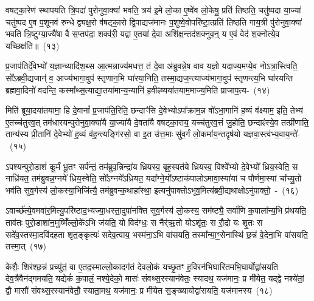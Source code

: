 वषट्का॒रेण॑ स्थापयति त्रि॒पदा॑ पुरोनुवा॒क्या॑ भवति॒ त्रय॑ इ॒मे लो॒का ए॒ष्वे॑व लो॒केषु॒ प्रति॑ तिष्ठति॒ चतु॑ष्पदा या॒ज्या॑ चतु॑ष्पद ए॒व प॒शूनव॑ रुन्धे द्व्यक्ष॒रो व॑षट्का॒रो द्वि॒पाद्यज॑मानः प॒शुष्वे॒वोपरि॑ष्टा॒त्प्रति॑ तिष्ठति गाय॒त्री पु॑रोनुवा॒क्या॑ भवति त्रि॒ष्टुग्या॒ज्यै॑षा वै स॒प्तप॑दा॒ शक्व॑री॒ यद्वा ए॒तया॑ दे॒वा अशि॑क्ष॒न्तद॑शक्नुव॒न्॒ य ए॒वं वेद॑ श॒क्नोत्ये॒व यच्छिक्ष॑ति॥~(१३)

{\anuvakamend[{दे॒वता॑नाङ्करोत्यु॒परि॑ष्टाल्ल॒क्ष्मा\-ऽऽ\-ज्य॑भागौ॒ प्रति॑ श॒क्नोत्ये॒व द्वे च॑}]}%

प्र॒जा\-प॑तिर्दे॒वेभ्यो॑ य॒ज्ञान्व्यादि॑श॒थ्स आ॒त्मन्नाज्य॑\-मधत्त॒ तं दे॒वा अ॑ब्रुवन्ने॒ष वाव य॒ज्ञो यदाज्य॒मप्ये॒व नो\-ऽत्रा॒स्त्विति॒ सो᳚\-ऽब्रवी॒द्यजान्॑ व॒ आज्य॑\-भागा॒वुप॑ स्तृणान॒भि घा॑रया॒निति॒ तस्मा॒द्\-यज॒न्त्याज्य॑\-भागा॒वुप॑ स्तृणन्त्य॒भि घा॑रयन्ति ब्रह्मवा॒दिनो॑ वदन्ति॒ कस्मा᳚थ्स॒त्याद्या॒तया॑\-मान्य॒न्यानि॑ ह॒वीꣴष्यया॑त\-याम॒माज्य॒\-मिति॑ प्राजाप॒त्य-~(१४)

मिति॑ ब्रूया॒दया॑तयामा॒ हि दे॒वानां᳚ प्र॒जा\-प॑ति॒रिति॒ छन्दाꣳ॑सि दे॒वेभ्यो\-ऽपा᳚क्राम॒न्न वो॑\-ऽभा॒गानि॑ ह॒व्यं व॑क्ष्याम॒ इति॒ तेभ्य॑ ए॒तच्च॑तुरव॒त् तम॑धारयन्पुरोनुवा॒क्या॑यै या॒ज्या॑यै दे॒वता॑यै वषट्का॒राय॒ यच्च॑तुरव॒त्तं जु॒होति॒ छन्दाꣴ॑स्ये॒व तत्प्री॑णाति॒ तान्य॑स्य प्री॒तानि॑ दे॒वेभ्यो॑ ह॒व्यं व॑ह॒न्त्यङ्गि॑रसो॒ वा इ॒त उ॑त्त॒माः सु॑व॒र्गं लो॒कमा॑य॒न्तदृष॑यो यज्ञवा॒स्त्व॑भ्य॒वाय॒न्ते॑-~(१५)

ऽपश्यन्पुरो॒डाशं॑ कू॒र्मं भू॒तꣳ सर्प॑न्तं॒ तम॑ब्रुव॒न्निन्द्रा॑य ध्रियस्व॒ बृह॒स्पत॑ये ध्रियस्व॒ विश्वे᳚भ्यो दे॒वेभ्यो᳚ ध्रिय॒स्वेति॒ स नाध्रि॑यत॒ तम॑ब्रुवन्न॒ग्नये᳚ ध्रिय॒स्वेति॒ सो᳚\-ऽग्नये᳚\-ऽध्रियत॒ यदा᳚ग्ने॒यो᳚\-ऽष्टाक॑पालो\-ऽमावा॒स्या॑यां च पौर्णमा॒स्यां चा᳚च्यु॒तो भव॑ति सुव॒र्गस्य॑ लो॒कस्या॒भिजि॑त्यै॒ तम॑ब्रुवन्क॒थाहा᳚स्था॒ इत्यनु॑पाक्तो\-ऽभूव॒मित्य॑ब्रवी॒द्यथाक्षो\-ऽनु॑पाक्तो॒~-~(१६)

ऽवार्च्छ॑त्ये॒वमवा॑र॒मित्यु॒परि॑ष्टाद॒भ्यज्या॒धस्ता॒दुपा॑नक्ति सुव॒र्गस्य॑ लो॒कस्य॒ सम॑ष्ट्यै॒ सर्वा॑णि क॒पाला᳚न्य॒भि प्र॑थयति॒ ताव॑तः पुरो॒\-डाशा॑\-न॒मुष्मिँ॑ल्लो॒के॑\-ऽभि ज॑यति॒ यो विद॑ग्धः॒ स नैर्॑\mbox{}ऋ॒तो यो\-ऽशृ॑तः॒ स रौ॒द्रो यः शृ॒तः स सदे॑व॒स्तस्मा॒दवि॑दहता शृत॒ङ्कृत्यः॑ सदेव॒त्वाय॒ भस्म॑ना॒\-ऽभि वा॑सयति॒ तस्मा᳚न्मा॒ꣳ॒सेनास्थि॑ छ॒न्नं वे॒देना॒भि वा॑सयति॒ तस्मा॒त्~(१७)

केशैः॒ शिर॑श्छ॒न्नं प्रच्यु॑तं॒ वा ए॒तद॒स्माल्लो॒कादग॑तं देवलो॒कं यच्छृ॒तꣳ ह॒विरन॑भिघारितमभि॒घार्योद्वा॑सयति देव॒त्रैवैन॑द्गमयति॒ यद्येकं॑ क॒पालं॒ नश्ये॒देको॒ मासः॑ संवथ्स॒रस्यान॑वेतः॒ स्यादथ॒ यज॑मानः॒ प्र मी॑येत॒ यद्द्वे नश्ये॑तां॒ द्वौ मासौ॑ संवथ्स॒रस्यान॑वेतौ॒ स्याता॒मथ॒ यज॑मानः॒ प्र मी॑येत स॒ङ्ख्यायोद्वा॑सयति॒ यज॑मानस्य~(१८)

